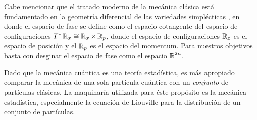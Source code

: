 Cabe mencionar que el tratado moderno de la mecánica clásica
está fundamentado en la geometría diferencial de las
variedades simplécticas \cite{mcinerney2013}, en donde el
espacio de fase se define como el espacio cotangente del
espacio de configuraciones $T^{*} \operatorname{\mathbb{R}}_x \cong \operatorname{\mathbb{R}}_x \times
\operatorname{\mathbb{R}}_p$, donde el espacio de configuraciones  $\operatorname{\mathbb{R}}_x$ es el
espacio de posición y el $\operatorname{\mathbb{R}}_p$ es el espacio del momentum.
Para nuestros objetivos basta con desginar el espacio de
fase como el espacio $\operatorname{\mathbb{R}}^{2n}$.

Dado que la mecánica cuántica es una teoría estadística, es
más apropiado comparar la mecánica de una sola partícula
cuántica con un \textit{conjunto} de partículas clásicas. La
maquinaría utilizada para éste propósito es la mecánica
estadística, especialmente la ecuación de Liouville para la
distribución de un conjunto de partículas.




